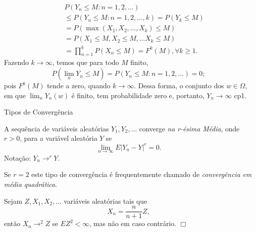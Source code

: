 %
\begin{frame}
\begin{block}{}
%
\begin{eqnarray}
& & P(Y_n\leq M:n=1,2,\ldots)\nonumber\\
& & \leq P(Y_n\leq M:n=1,2,\ldots,k)= P(Y_k\leq M) \nonumber \\
& & =P(\max(X_1,X_2,\ldots,X_k)\leq M)\nonumber\\
& & =P(X_1\leq M,X_2\leq M,\ldots X_k\leq M) \nonumber \\
& &=\prod_{n=1}^{k}P(X_n\leq M)=F^k(M),\forall k\geq 1.\nonumber
\end{eqnarray}
%
Fazendo $k\rightarrow\infty$, temos que para todo $M$ finito,
%
$$P(\lim_n Y_n\leq M)=P(Y_n\leq M:n=1,2,\ldots)=0;$$
pois $F^k(M)$ tende a zero, quando $k\rightarrow\infty$. Dessa
forma, o conjunto dos $w\in\Omega$, em que $\lim_n Y_n(w)$ é finito,
tem probabilidade zero e, portanto, $Y_n\rightarrow\infty$ cp1.
%
\end{block}
\end{frame}
%
\begin{frame}{Tipos de Convergência}
%
\begin{defi}
A sequência de variáveis aleatórias $Y_1,Y_2,\ldots$ converge {\em
na r-ésima Média}, onde $r>0$, para a variável aleatória $Y$ se
%
$$\lim_{n\rightarrow\infty}E|Y_n-Y|^r=0.$$
Notação: $Y_n\rightarrow^r Y$.
\end{defi}
%
Se $r=2$ este tipo de convergência é frequentemente chamado de {\em
convergência em média quadrática}.

%
%
%
%
%
%
\begin{exem}
Sejam $Z,X_1,X_2,\ldots$ variáveis aleatórias tais que
$$X_n=\frac{n}{n+1}Z,$$
então $X_n\rightarrow^2 Z$ se $EZ^2<\infty$, mas não em caso
contrário. $\Box$
\end{exem}

\end{frame}
